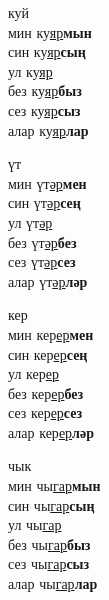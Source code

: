 \begin{multicols}{4}
\begin{enumerate}
\begin{minipage}{\linewidth}
    \item
    куй\\
    мин ку\underline{яр}\textbf{мын}\\
    син ку\underline{яр}\textbf{сың}\\
    ул ку\underline{яр}\\
    без ку\underline{яр}\textbf{быз}\\
    сез ку\underline{яр}\textbf{сыз}\\
    алар ку\underline{яр}\textbf{лар}\\
\end{minipage}

\begin{minipage}{\linewidth}
    \item
    үт\\
    мин үт\underline{әр}\textbf{мен}\\
    син үт\underline{әр}\textbf{сең}\\
    ул үт\underline{әр}\\
    без үт\underline{әр}\textbf{без}\\
    сез үт\underline{әр}\textbf{сез}\\
    алар үт\underline{әр}\textbf{ләр}\\
\end{minipage}

\begin{minipage}{\linewidth}
    \item
    кер\\
    мин кер\underline{ер}\textbf{мен}\\
    син кер\underline{ер}\textbf{сең}\\
    ул кер\underline{ер}\\
    без кер\underline{ер}\textbf{без}\\
    сез кер\underline{ер}\textbf{сез}\\
    алар кер\underline{ер}\textbf{ләр}\\
\end{minipage}

\begin{minipage}{\linewidth}
    \item
    чык\\
    мин чы\underline{гар}\textbf{мын}\\
    син чы\underline{гар}\textbf{сың}\\
    ул чы\underline{гар}\\
    без чы\underline{гар}\textbf{быз}\\
    сез чы\underline{гар}\textbf{сыз}\\
    алар чы\underline{гар}\textbf{лар}\\
\end{minipage}


\end{enumerate}
\end{multicols}
